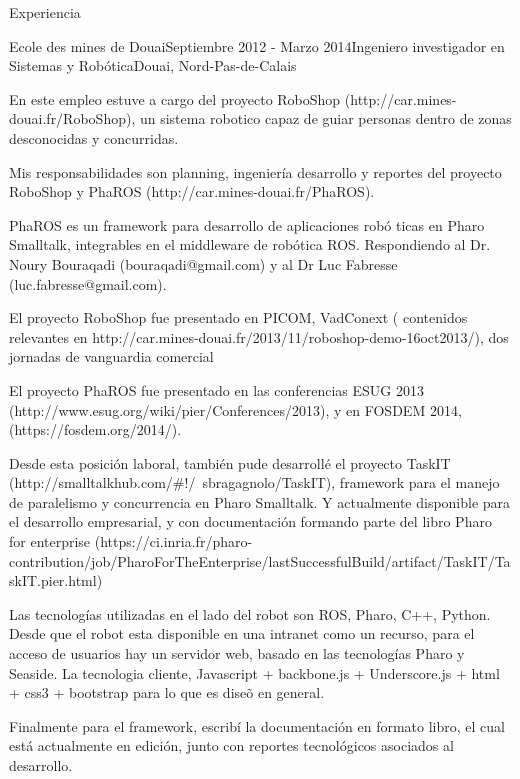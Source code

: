 \documentclass{resume} %
\begin{document}
\begin{rSection}{Experiencia}

\begin{rSubsection}{Ecole des mines de Douai}{Septiembre 2012 - Marzo 2014}{Ingeniero investigador en Sistemas y Rob\'otica}{Douai, Nord-Pas-de-Calais}
\item En este empleo estuve a cargo del proyecto RoboShop (http://car.mines-douai.fr/RoboShop), un sistema robotico capaz de guiar personas dentro de zonas desconocidas y concurridas. 
\item Mis responsabilidades son planning, ingenier\'ia desarrollo y reportes del proyecto RoboShop y PhaROS (http://car.mines-douai.fr/PhaROS). 
\item PhaROS es un framework para desarrollo de aplicaciones rob\'o ticas en Pharo Smalltalk, integrables en el middleware de rob\'otica ROS.  Respondiendo al Dr. Noury Bouraqadi (bouraqadi@gmail.com) y al Dr Luc Fabresse (luc.fabresse@gmail.com). 
\item El proyecto RoboShop fue presentado en PICOM, VadConext ( contenidos relevantes en http://car.mines-douai.fr/2013/11/roboshop-demo-16oct2013/), dos jornadas de vanguardia comercial 
\item El proyecto PhaROS fue presentado en las conferencias ESUG 2013 (http://www.esug.org/wiki/pier/Conferences/2013), y en FOSDEM 2014, (https://fosdem.org/2014/).
\item Desde esta posici\'on laboral, tambi\'en pude desarroll\'e el proyecto TaskIT (http://smalltalkhub.com/\#!/~sbragagnolo/TaskIT), framework para el manejo de paralelismo y concurrencia en Pharo Smalltalk. Y actualmente disponible para el desarrollo empresarial, y con documentaci\'on formando parte del libro Pharo for enterprise (https://ci.inria.fr/pharo-contribution/job/PharoForTheEnterprise/lastSuccessfulBuild/artifact/TaskIT/TaskIT.pier.html)
\item Las tecnolog\'ias utilizadas en el lado del robot son ROS, Pharo, C++, Python. Desde que el robot esta disponible en una intranet como un recurso, para el acceso de usuarios hay un servidor web, basado en las tecnolog\'ias Pharo y Seaside. La tecnologia cliente, Javascript + backbone.js + Underscore.js + html + css3 + bootstrap para lo que es dise\~o en general. 
\item Finalmente para el framework, escrib\'i la documentaci\'on en formato libro, el cual est\'a actualmente en edici\'on, junto con reportes tecnol\'ogicos asociados al desarrollo.
\end{rSubsection}



\end{rSection}
\end{document}
